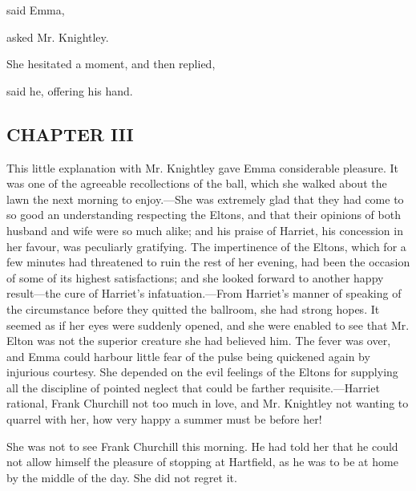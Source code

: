  said Emma, 

 asked Mr. Knightley.

She hesitated a moment, and then replied, 

 said he, offering his hand.



\subsection[chapter-iii-2]{\useURL[url41][][][]\from[url41]CHAPTER III}

This little explanation with Mr. Knightley gave Emma considerable pleasure. It was one of the agreeable recollections of the ball, which she walked about the lawn the next morning to enjoy.---She was extremely glad that they had come to so good an understanding respecting the Eltons, and that their opinions of both husband and wife were so much alike; and his praise of Harriet, his concession in her favour, was peculiarly gratifying. The impertinence of the Eltons, which for a few minutes had threatened to ruin the rest of her evening, had been the occasion of some of its highest satisfactions; and she looked forward to another happy result---the cure of Harriet's infatuation.---From Harriet's manner of speaking of the circumstance before they quitted the ballroom, she had strong hopes. It seemed as if her eyes were suddenly opened, and she were enabled to see that Mr. Elton was not the superior creature she had believed him. The fever was over, and Emma could harbour little fear of the pulse being quickened again by injurious courtesy. She depended on the evil feelings of the Eltons for supplying all the discipline of pointed neglect that could be farther requisite.---Harriet rational, Frank Churchill not too much in love, and Mr. Knightley not wanting to quarrel with her, how very happy a summer must be before her!

She was not to see Frank Churchill this morning. He had told her that he could not allow himself the pleasure of stopping at Hartfield, as he was to be at home by the middle of the day. She did not regret it.

